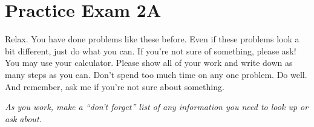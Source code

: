 
\section*{Practice Exam 2A}  

Relax.  You have done problems like these before.  Even if these problems look a bit different, just do what you can.  If you're not sure of something, please ask! You may use your calculator.  Please show all of your work and write down as many steps as you can.  Don't spend too much time on any one problem.  Do well.  And remember, ask me if you're not sure about something. \bigskip

\noindent \emph{As you work, make a ``don't forget'' list of any information you need to look up or ask about.} 

\noindent \hrulefill
\bigskip

